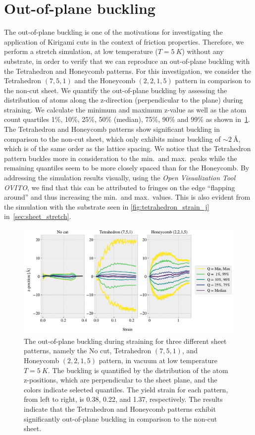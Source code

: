 \section{Out-of-plane buckling}\label{sec:out-of-plane_buckling}
The out-of-plane buckling is one of the motivations for investigating
the application of Kirigami cuts in the context of friction properties. Therefore, we perform a stretch simulation, at low temperature ($T = \SI{5}{K}$) without any substrate, in order to verify that we can reproduce an out-of-plane buckling with the Tetrahedron and Honeycomb patterns. For this investigation, we consider the Tetrahedron $(7,5,1)$ and the Honeycomb $(2,2,1,5)$ pattern in comparison to the non-cut sheet. We quantify the out-of-plane buckling by assessing the distribution of atoms along the z-direction (perpendicular to the plane) during straining. We calculate the
minimum and maximum z-value as well as the atom count quartiles 1\%, 10\%, 25\%, 50\% (median), 75\%, 90\% and 99\% as shown in~\cref{fig:buckling_quartiles}. The Tetrahedron and Honeycomb patterns show significant buckling in comparison to the non-cut sheet, which only exhibits minor buckling of $\sim \SI{2}{\text{Å}}$, which is of the same order as the lattice spacing. We notice that the Tetrahedron pattern buckles more in consideration to the min.\ and max.\ peaks while the remaining quantiles seem to be more closely spaced than for the Honeycomb. By addressing the simulation results visually, using the \textit{Open Visualization Tool OVITO}, we find that this can be attributed to fringes on the edge ``flapping around'' and thus increasing the min.\ and max.\ values. This is also evident from the simulation with the substrate seen in \cref{fig:tetrahedron_strain_j} in~\cref{sec:sheet_stretch}.

\begin{figure}[H]
  \centering
  \includegraphics[width=\linewidth]{figures/baseline/vacuum_normal_buckling.pdf}
  \caption{The out-of-plane buckling during straining for three different sheet patterns, namely the No cut, Tetrahedron $(7,5,1)$, and Honeycomb $(2,2,1,5)$ pattern, in vacuum at low temperature $T = \SI{5}{K}$. The buckling is quantified by the distribution of the atom z-positions, which are perpendicular to the sheet plane, and the colors indicate selected quantiles. The yield strain for each pattern, from left to right, is 0.38, 0.22, and 1.37, respectively. The results indicate that the Tetrahedron and Honeycomb patterns exhibit significantly out-of-plane buckling in comparison to the non-cut sheet.}
  \label{fig:buckling_quartiles}
\end{figure}

